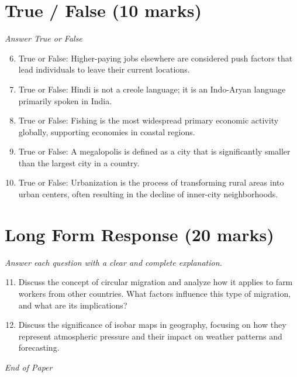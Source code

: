 \documentclass[12pt]{article}
\begin{document}
\section*{True / False (10 marks)}
\textit{Answer True or False}
\begin{enumerate}[label=\arabic*.]
\setcounter{enumi}{5}
\item True or False: Higher-paying jobs elsewhere are considered push factors that lead individuals to leave their current locations.
\item True or False: Hindi is not a creole language; it is an Indo-Aryan language primarily spoken in India.
\item True or False: Fishing is the most widespread primary economic activity globally, supporting economies in coastal regions.
\item True or False: A megalopolis is defined as a city that is significantly smaller than the largest city in a country.
\item True or False: Urbanization is the process of transforming rural areas into urban centers, often resulting in the decline of inner-city neighborhoods.
\end{enumerate}

\section*{Long Form Response (20 marks)}
\textit{Answer each question with a clear and complete explanation.}
\begin{enumerate}[label=\arabic*.]
\setcounter{enumi}{10}
\item Discuss the concept of circular migration and analyze how it applies to farm workers from other countries. What factors influence this type of migration, and what are its implications?
\item Discuss the significance of isobar maps in geography, focusing on how they represent atmospheric pressure and their impact on weather patterns and forecasting.
\end{enumerate}

\vfill
\noindent\textit{End of Paper}
\end{document}
